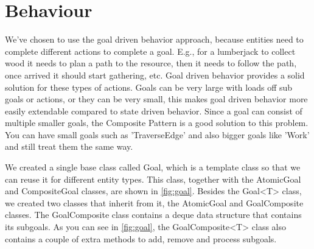 \section{Behaviour} 
\label{sec:behaviour} 
We've chosen to use the goal driven behavior approach, because entities need 
to complete different actions to complete a goal. E.g., for a lumberjack to 
collect wood it needs to plan a path to the resource, then it needs to follow 
the path, once arrived it should start gathering, etc. Goal driven behavior 
provides a solid solution for these types of actions. Goals can be very large 
with loads off sub goals or actions, or they can be very small, this makes 
goal driven behavior more easily extendable compared to state driven behavior. 
Since a goal can consist of multiple smaller goals, the Composite Pattern is 
a good solution to this problem. You can have small goals such as 
'TraverseEdge' and also bigger goals like 'Work' and still treat them the same 
way. \cite{composite-pattern}

We created a single base class called Goal, which is a template class so that
we can reuse it for different entity types. This class, together with the
AtomicGoal and CompositeGoal classes, are shown in \cref{fig:goal}. Besides the
Goal<T> class, we created two classes that inherit from it, the AtomicGoal and
GoalComposite classes. The GoalComposite class contains a deque data structure
that contains its subgoals. As you can see in \cref{fig:goal}, the
GoalComposite<T> class also contains a couple of extra methods to add, remove 
and process subgoals.



